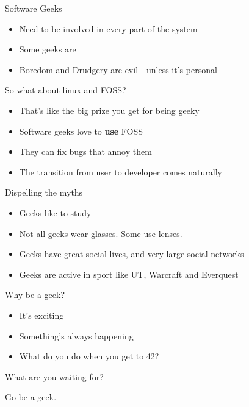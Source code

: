 \documentclass{beamer}
\begin{document}
\begin{frame}{Software Geeks}
  \begin{itemize}
  \item Need to be involved in every part of the system
  \item Some geeks are \href{http://www.catb.org/jargon/html/H/hacker.html}{}
  \item Boredom and Drudgery are evil - unless it's personal
  \end{itemize}
\end{frame}

\begin{frame}{So what about linux and FOSS?}
  \begin{itemize}
  \item That's like the big prize you get for being geeky
  \item Software geeks love to \textbf{use} FOSS
  \item They can fix bugs that annoy them
  \item The transition from user to developer comes naturally
  \end{itemize}
\end{frame}

\begin{frame}{Dispelling the myths}
  \begin{itemize}
  \item Geeks like to study
  \item Not all geeks wear glasses.  Some use lenses.
  \item Geeks have great social lives, and very large social networks
  \item Geeks are active in sport like UT, Warcraft and Everquest
  \end{itemize}
\end{frame}

\begin{frame}{Why be a geek?}
  \begin{itemize}
  \item It's exciting
  \item Something's always happening
  \item What do you do when you get to 42?
  \end{itemize}
\end{frame}

\begin{frame}{What are you waiting for?}
  \begin{center}
  Go be a geek.
  \end{center}
\end{frame}
\end{document}

